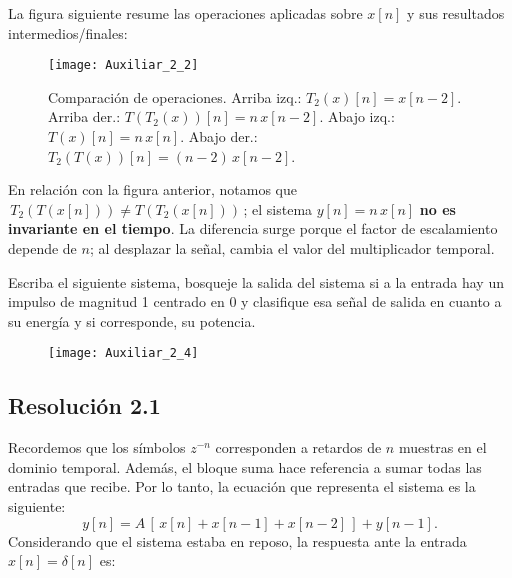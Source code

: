 \documentclass[
  11pt,
  letterpaper,
   addpoints,
  ]{exam}
\begin{document}
\begin{questions}
\begin{solution}
La figura siguiente resume las operaciones aplicadas sobre $x[n]$ y sus resultados intermedios/finales:

\begin{figure}[H]
  \centering
  \texttt{[image: Auxiliar\_2\_2]}
  \caption{Comparación de operaciones. Arriba izq.: $T_2(x)[n]=x[n-2]$. Arriba der.: $T(T_2(x))[n]=n\,x[n-2]$. Abajo izq.: $T(x)[n]=n\,x[n]$. Abajo der.: $T_2(T(x))[n]=(n-2)\,x[n-2]$.}
\end{figure}

En relación con la figura anterior, notamos que $\,T_2(T(x[n])) \neq T(T_2(x[n]))\,$; el sistema $y[n]=n\,x[n]$ \textbf{no es invariante en el tiempo}. La diferencia surge porque el factor de escalamiento depende de $n$; al desplazar la señal, cambia el valor del multiplicador temporal.
\end{solution}
\question Escriba el siguiente sistema, bosqueje la salida del sistema si a la entrada hay un impulso de magnitud 1 centrado en 0 y clasifique esa señal de salida en cuanto a su energía y si corresponde, su potencia.
\begin{figure}[H]
  \centering
  \texttt{[image: Auxiliar\_2\_4]}
\end{figure}
\begin{solution}
\subsection*{Resolución 2.1}
Recordemos que los símbolos $z^{-n}$ corresponden a retardos de $n$ muestras en el dominio temporal. Además, el bloque suma hace referencia a sumar todas las entradas que recibe. Por lo tanto, la ecuación que representa el sistema es la siguiente:
\begin{equation}
y[n] = A\,[\,x[n] + x[n-1] + x[n-2]\,] + y[n-1].
\end{equation}
Considerando que el sistema estaba en reposo, la respuesta ante la entrada $x[n] = \delta[n]$ es:


\end{solution}
\end{questions}
\end{document}

